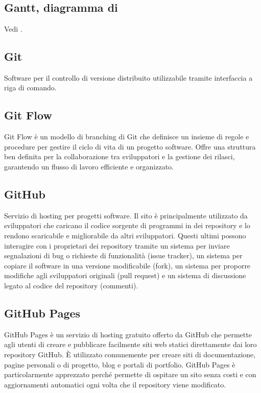 
\section{}

\subsection*{Gantt, diagramma di}
Vedi .

\hypertarget{sec:git}{}
\subsection*{Git}
Software per il controllo di versione distribuito utilizzabile tramite interfaccia a riga di comando.

\hypertarget{sec:git_flow}{}
\subsection*{Git Flow}
Git Flow è un modello di branching di Git che definisce un insieme di regole e procedure per gestire il ciclo di vita di un progetto 
software. Offre una struttura ben definita per la collaborazione tra sviluppatori e la gestione dei rilasci, garantendo un flusso di 
lavoro efficiente e organizzato.

\subsection*{GitHub}
Servizio di hosting per progetti software. Il sito è principalmente utilizzato da sviluppatori che caricano il codice sorgente di programmi in dei 
repository e lo rendono scaricabile e migliorabile da altri sviluppatori. Questi ultimi possono interagire con i proprietari dei repository tramite un 
sistema per inviare segnalazioni di bug o richieste di funzionalità (issue tracker), un sistema per copiare il software in una versione modificabile 
(fork), un sistema per proporre modifiche agli sviluppatori originali (pull request) e un sistema di discussione legato al codice del repository (commenti).

\subsection*{GitHub Pages}
GitHub Pages è un servizio di hosting gratuito offerto da GitHub che permette agli utenti di creare e pubblicare facilmente siti web statici direttamente 
dai loro repository GitHub. È utilizzato comunemente per creare siti di documentazione, pagine personali o di progetto, blog e portali di portfolio. 
GitHub Pages è particolarmente apprezzato perché permette di ospitare un sito senza costi e con aggiornamenti automatici ogni volta che il repository 
viene modificato.

